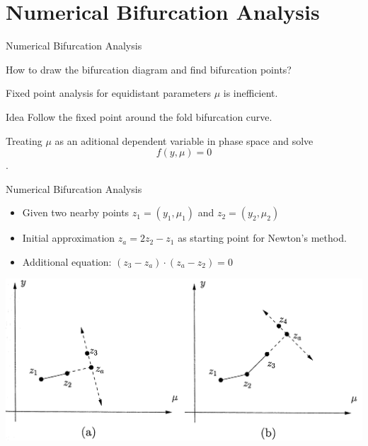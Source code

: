 \documentclass{beamer}
\begin{document}
\section{Numerical Bifurcation Analysis}
\begin{frame}{Numerical Bifurcation Analysis}
    \begin{block}{}
        How to draw the bifurcation diagram and find bifurcation points?
    \end{block}
    Fixed point analysis for equidistant parameters $\mu$ is inefficient.
    
    \begin{block}{Idea}
        Follow the fixed point around the fold bifurcation curve.
    \end{block}
    
    Treating $\mu$ as an aditional dependent variable in phase space and solve 
    $$f(y, \mu) = 0$$. 
    
\end{frame}

\begin{frame}{Numerical Bifurcation Analysis}
    
    \begin{itemize}
        \item Given two nearby points $z_{1} = (y_{1}, \mu_{1})$ and $z_2 = (y_2, \mu_2)${}
        \item Initial approximation $ z_{a} = 2 z_{2} - z_{1}$ as starting point for Newton's method.
        \item Additional equation: $(z_3 - z_a) \cdot (z_a - z_2) = 0$
    \end{itemize}
    \includegraphics[width=\textwidth]{grafik/pathfollow}

\end{frame}
\end{document}
